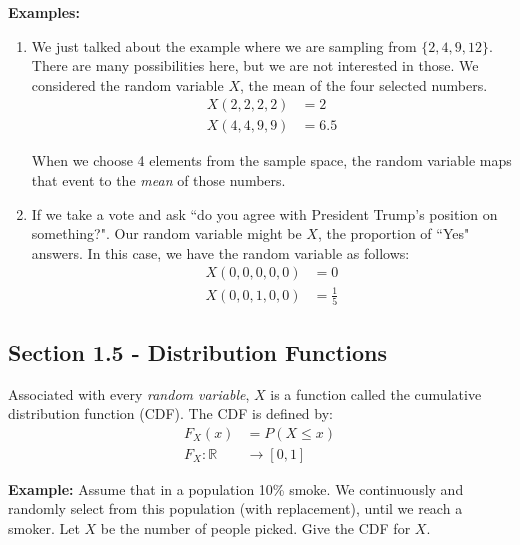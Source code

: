 \documentclass{article}
\begin{document}
\noindent \textbf{Examples:}
\begin{enumerate}
    \item We just talked about the example where we are sampling from $\{2,4,9,12\}$. There are many possibilities here, but we are not interested in those. We considered the random variable $X$, the mean of the four selected numbers.
    \begin{equation*}
    \begin{split}
        X(2, 2, 2, 2) &= 2\\
        X(4,4,9,9) &= 6.5
    \end{split}
    \end{equation*}
    
    When we choose 4 elements from the sample space, the random variable maps that event to the \textit{mean} of those numbers.
    
    \item If we take a vote and ask ``do you agree with President Trump's position on something?". Our random variable might be $X$, the proportion of ``Yes" answers. In this case, we have the random variable as follows:
    \begin{equation*}
        \begin{split}
            X(0,0,0,0,0)&= 0\\
            X(0,0,1,0,0) &= \frac{1}{5}
        \end{split}
    \end{equation*}
\end{enumerate}

\subsection{Section 1.5 - Distribution Functions}

Associated with every \textit{random variable}, $X$ is a function called the cumulative distribution function (CDF). The CDF is defined by:
\begin{equation*}
\begin{split}
    F_X(x) &= P(X \leq x)\\
    F_X : \mathbb{R} &\to [0,1]
\end{split}
\end{equation*}

\noindent\textbf{Example:} Assume that in a population 10\% smoke. We continuously and randomly select from this population (with replacement), until we reach a smoker. Let $X$ be the number of people picked. Give the CDF for $X$.
\end{document}
